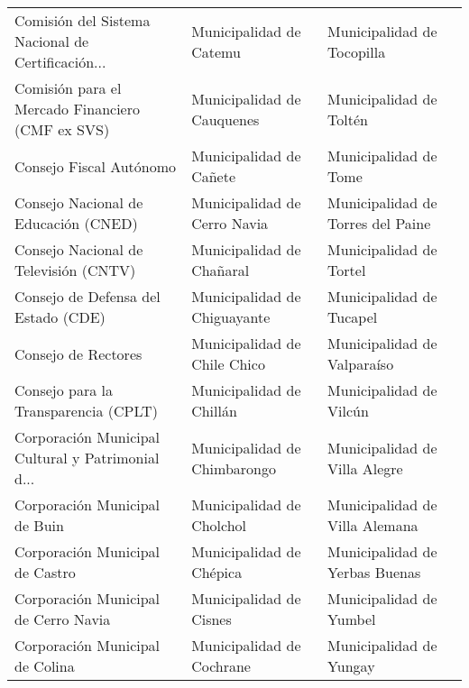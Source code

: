 \documentclass[11pt]{article}
\begin{document}
\begin{longtable}{ p{5cm} | p{5cm} | p{5cm} }
 Comisión del Sistema Nacional de Certificación... &                            Municipalidad de Catemu &                         Municipalidad de Tocopilla \\
 Comisión para el Mercado Financiero (CMF  ex SVS) &                         Municipalidad de Cauquenes &                            Municipalidad de Toltén \\
                           Consejo Fiscal Autónomo &                            Municipalidad de Cañete &                              Municipalidad de Tome \\
              Consejo Nacional de Educación (CNED) &                       Municipalidad de Cerro Navia &                  Municipalidad de Torres del Paine \\
             Consejo Nacional de Televisión (CNTV) &                          Municipalidad de Chañaral &                            Municipalidad de Tortel \\
               Consejo de Defensa del Estado (CDE) &                       Municipalidad de Chiguayante &                           Municipalidad de Tucapel \\
                               Consejo de Rectores &                       Municipalidad de Chile Chico &                        Municipalidad de Valparaíso \\
              Consejo para la Transparencia (CPLT) &                           Municipalidad de Chillán &                            Municipalidad de Vilcún \\
 Corporación Municipal Cultural y Patrimonial d... &                       Municipalidad de Chimbarongo &                      Municipalidad de Villa Alegre \\
                     Corporación Municipal de Buin &                          Municipalidad de Cholchol &                     Municipalidad de Villa Alemana \\
                   Corporación Municipal de Castro &                           Municipalidad de Chépica &                     Municipalidad de Yerbas Buenas \\
              Corporación Municipal de Cerro Navia &                            Municipalidad de Cisnes &                            Municipalidad de Yumbel \\
                   Corporación Municipal de Colina &                          Municipalidad de Cochrane &                            Municipalidad de Yungay \\

\end{longtable}
\end{document}
